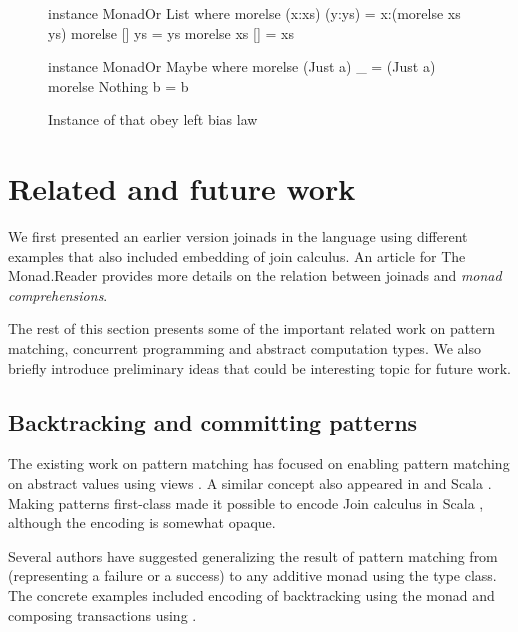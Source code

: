 \documentclass[preprint]{sigplanconf}
\begin{document}
\begin{figure}
\label{fig:monador-instances}
\begin{code}
instance MonadOr List where
  morelse (x:xs) (y:ys) = x:(morelse xs ys)
  morelse [] ys = ys
  morelse xs [] = xs

instance MonadOr Maybe where
  morelse (Just a) _ = (Just a)
  morelse Nothing b = b
\end{code}
\caption{Instance of  that obey left bias law}
\end{figure}


\section{Related and future work}
\label{sec:related}

We first presented an earlier version joinads in the \fsharp language \cite{joinads} using 
different examples that also included embedding of join calculus. An article for
The Monad.Reader \cite{parcomprefun} provides more details on the relation between joinads
and \textit{monad comprehensions}.

The rest of this section presents some of the important related work on pattern matching, concurrent
programming and abstract computation types. We also briefly introduce preliminary ideas that 
could be interesting topic for future work.


\subsection{Backtracking and committing patterns}
\label{sec:related-monadplus}

The existing work on pattern matching has focused on enabling pattern matching on abstract values 
using views \cite{views-haskell, views-sml}. A similar concept also appeared in \fsharp and Scala 
\cite{scala-patternmatching, activepatterns}. Making patterns first-class made it possible to encode 
Join calculus in Scala \cite{scala-encodingjoins}, although the encoding is somewhat opaque.

Several authors \cite{firstlcasspats, activepatterns} have suggested generalizing the result of 
pattern matching from  (representing a failure or a success) to any additive monad 
using the  type class. The concrete examples included encoding of backtracking 
using the  monad and composing transactions using .
\end{document}
